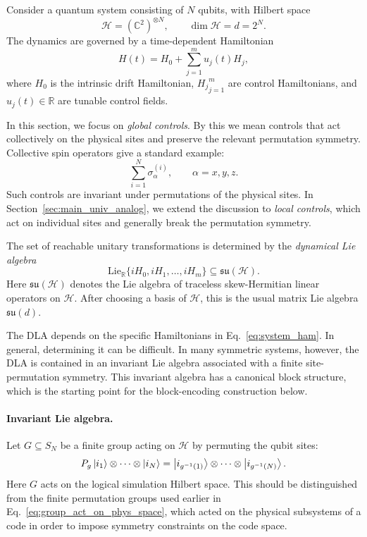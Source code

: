\documentclass[10pt,twocolumn,superscriptaddress,aps,amsmath,amssymb,citeautoscript,floatfix,prx]{revtex4-2}
\newcounter{alg}
\theoremstyle{plain}
\theoremstyle{plain}
\theoremstyle{plain}
\theoremstyle{plain}
\theoremstyle{plain}
\theoremstyle{plain}
\begin{document}
Consider a quantum system consisting of $N$ qubits, with Hilbert space
$$
\mathcal H=(\mathbb C^2)^{\otimes N},
\qquad
\dim\mathcal H=d=2^N .
$$
The dynamics are governed by a time-dependent Hamiltonian
\begin{equation}\label{eq:system_ham}
H(t)
=
H_0
+
\sum_{j=1}^m u_j(t)H_j,
\end{equation}
where $H_0$ is the intrinsic drift Hamiltonian, ${H_j}_{j=1}^m$ are control Hamiltonians, and $u_j(t)\in\mathbb R$ are tunable control fields.

In this section, we focus on \textit{global controls}. By this we mean controls that act collectively on the physical sites and preserve the relevant permutation symmetry. Collective spin operators give a standard example:
$$
\sum_{i=1}^N \sigma_\alpha^{(i)},
\qquad
\alpha=x,y,z .
$$
Such controls are invariant under permutations of the physical sites. In Section~\ref{sec:main_univ_analog}, we extend the discussion to \textit{local controls}, which act on individual sites and generally break the permutation symmetry.

The set of reachable unitary transformations is determined by the \textit{dynamical Lie algebra}~\cite{DAlessandro2021, Albertini2003}
$$
\mathrm{Lie}_{\mathbb R}
\{iH_0,iH_1,\ldots,iH_m\}
\subseteq
\mathfrak{su}(\mathcal H).
$$
Here $\mathfrak{su}(\mathcal H)$ denotes the Lie algebra of traceless skew-Hermitian linear operators on $\mathcal H$. After choosing a basis of $\mathcal H$, this is the usual matrix Lie algebra $\mathfrak{su}(d)$.

The DLA depends on the specific Hamiltonians in Eq.~\eqref{eq:system_ham}. In general, determining it can be difficult. In many symmetric systems, however, the DLA is contained in an invariant Lie algebra associated with a finite site-permutation symmetry. This invariant algebra has a canonical block structure, which is the starting point for the block-encoding construction below.

\paragraph{Invariant Lie algebra.}

Let $G\subseteq S_N$ be a finite group acting on $\mathcal H$ by permuting the qubit sites:
$$
P_g
\ket{i_1}\otimes\cdots\otimes\ket{i_N}
=
\ket{i_{g^{-1}(1)}}\otimes\cdots\otimes\ket{i_{g^{-1}(N)}} .
$$
Here $G$ acts on the logical simulation Hilbert space. This should be distinguished from the finite permutation groups used earlier in Eq.~\eqref{eq:group_act_on_phys_space}, which acted on the physical subsystems of a code in order to impose symmetry constraints on the code space.
\end{document}
